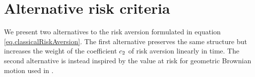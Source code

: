 \documentclass[10pt,a4paper]{article}
\begin{document}
%	
%	
% 	
%	
%	
%		
%	
%	






\section{Alternative risk criteria}\label{sec.alternativeRiskCriteria}
We present two alternatives to the risk aversion formulated  in equation \eqref{eq.classicalRiskAversion}. The first alternative preserves the same structure but increases the weight of the coefficient $c_{2}$ of risk aversion linearly in time.  The second alternative is instead inspired by the value at risk for geometric Brownian motion used in \cite{GS11opt}.
\end{document}
